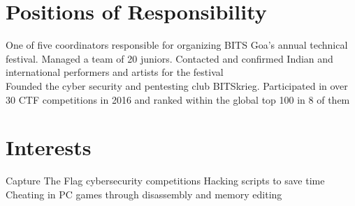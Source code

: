 \documentclass[]{illustris-resume-openfont}
\begin{document}
\begin{minipage}[t]{0.66\textwidth}
\section{Positions of Responsibility}
One of five coordinators responsible for organizing BITS Goa's annual technical festival. Managed a team of 20 juniors. Contacted and confirmed Indian and international performers and artists for the festival\\
\sectionsep
{}
Founded the cyber security and pentesting club BITSkrieg. Participated in over 30 CTF competitions in 2016 and ranked within the global top 100 in 8 of them

\section{Interests}
Capture The Flag cybersecurity competitions \textbullet{} Hacking scripts to save time \textbullet{} Cheating in PC games through disassembly and memory editing
\sectionsep

\end{minipage} 
\end{document}
